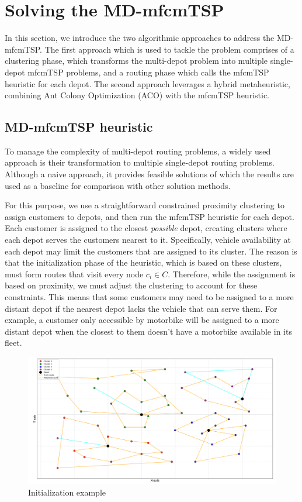 \documentclass{article}
\begin{document}
	\section{Solving the MD-mfcmTSP}
	In this section, we introduce the two algorithmic approaches to address the MD-mfcmTSP. The first approach which is used to tackle the problem comprises of a clustering phase, which transforms the multi-depot problem into multiple single-depot mfcmTSP problems, and a routing phase which calls the mfcmTSP heuristic for each depot. The second approach leverages a hybrid metaheuristic, combining Ant Colony Optimization (ACO) with the mfcmTSP heuristic.
	\subsection{MD-mfcmTSP heuristic}
	To manage the complexity of multi-depot routing problems, a widely used approach is their transformation to multiple single-depot routing problems. Although a naive approach, it provides feasible solutions of which the results are used as a baseline for comparison with other solution methods.
	\par 
	For this purpose, we use a straightforward constrained proximity clustering to assign customers to depots, and then run the mfcmTSP heuristic for each depot. Each customer is assigned to the closest \textit{possible} depot, creating clusters where each depot serves the customers nearest to it. Specifically, vehicle availability at each depot may limit the customers that are assigned to its cluster. The reason is that the initialization phase of the heuristic, which is based on these clusters, must form routes that visit every node $c_i\in C$. Therefore, while the assignment is based on proximity, we must adjust the clustering to account for these constraints. This means that some customers may need to be assigned to a more distant depot if the nearest depot lacks the vehicle that can serve them. For example, a customer only accessible by motorbike will be assigned to a more distant depot when the closest to them doesn't have a motorbike available in its fleet.
	\begin{figure}[h]
		\caption[width=\textwidth]{Initialization example}
		\includegraphics[width=\textwidth]{Initialization_example_p01}
		\centering
	\end{figure}
\end{document}
